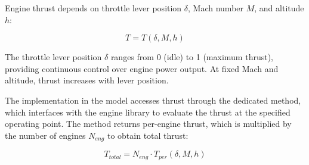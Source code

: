 Engine thrust depends on throttle lever position $\delta$, Mach number $M$, and altitude $h$:

\begin{equation}
T = T(\delta, M, h)
\end{equation}

The throttle lever position $\delta$ ranges from 0 (idle) to 1 (maximum thrust), providing continuous control over engine power output. At fixed Mach and altitude, thrust increases with lever position.

The implementation in the model accesses thrust through the dedicated method, which interfaces with the engine library to evaluate the thrust at the specified operating point. The method returns per-engine thrust, which is multiplied by the number of engines $N_{eng}$ to obtain total thrust:

\begin{equation}
T_{total} = N_{eng} \cdot T_{per}(\delta, M, h)
\end{equation}
